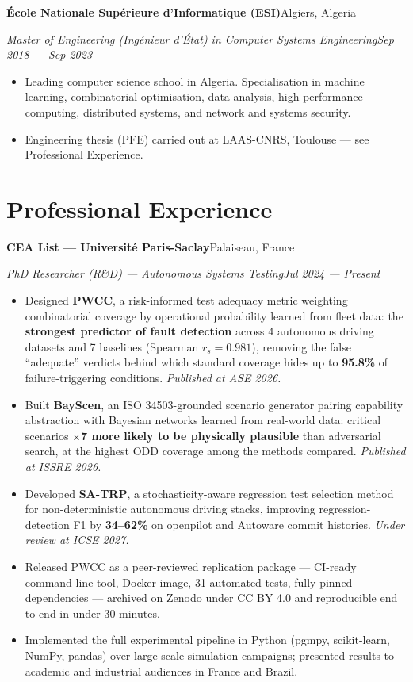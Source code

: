 \documentclass[a4paper,10pt]{article}
\newcommand{\cventry}[4]{%
  \vspace{3pt}%
  \begingroup\parfillskip=0pt\relax
    \textbf{#1}\hfill #2\par
    \textit{#3}\hfill \textit{#4}\par
  \endgroup
  \vspace{1pt}%
}
\begin{document}
\cventry{\'Ecole Nationale Sup\'erieure d'Informatique (ESI)}{Algiers, Algeria}
      {Master of Engineering (Ing\'enieur d'\'Etat) in Computer Systems Engineering}{Sep 2018 --- Sep 2023}
\begin{itemize}
  \item Leading computer science school in Algeria. Specialisation in machine learning, combinatorial optimisation, data analysis, high-performance computing, distributed systems, and network and systems security.
  \item Engineering thesis (PFE) carried out at LAAS-CNRS, Toulouse --- see Professional Experience.
\end{itemize}

\section*{Professional Experience}

\cventry{CEA List --- Universit\'e Paris-Saclay}{Palaiseau, France}
      {PhD Researcher (R\&D) --- Autonomous Systems Testing}{Jul 2024 --- Present}
\begin{itemize}
  \item Designed \textbf{PWCC}, a risk-informed test adequacy metric weighting combinatorial coverage by operational probability learned from fleet data: the \textbf{strongest predictor of fault detection} across 4 autonomous driving datasets and 7 baselines (Spearman $r_s = 0.981$), removing the false ``adequate'' verdicts behind which standard coverage hides up to \textbf{95.8\%} of failure-triggering conditions. \emph{Published at ASE 2026.}
  \item Built \textbf{BayScen}, an ISO 34503-grounded scenario generator pairing capability abstraction with Bayesian networks learned from real-world data: critical scenarios \textbf{$\times$7 more likely to be physically plausible} than adversarial search, at the highest ODD coverage among the methods compared. \emph{Published at ISSRE 2026.}
  \item Developed \textbf{SA-TRP}, a stochasticity-aware regression test selection method for non-deterministic autonomous driving stacks, improving regression-detection F1 by \textbf{34--62\%} on openpilot and Autoware commit histories. \emph{Under review at ICSE 2027.}
  \item Released PWCC as a peer-reviewed replication package --- CI-ready command-line tool, Docker image, 31 automated tests, fully pinned dependencies --- archived on Zenodo under CC BY 4.0 and reproducible end to end in under 30 minutes.
  \item Implemented the full experimental pipeline in Python (pgmpy, scikit-learn, NumPy, pandas) over large-scale simulation campaigns; presented results to academic and industrial audiences in France and Brazil.
\end{itemize}
\end{document}
